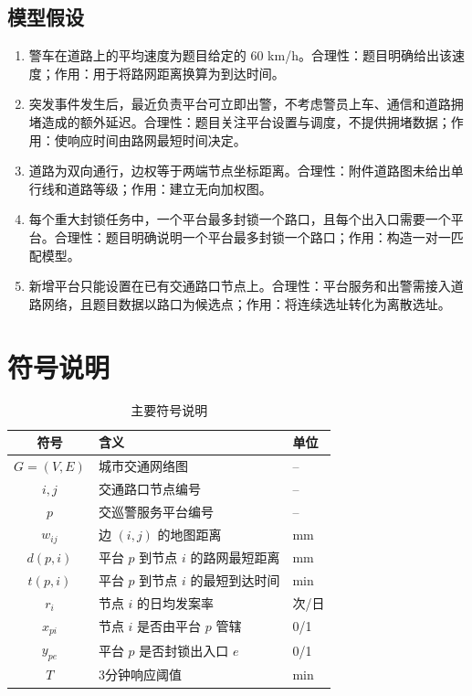 \documentclass[UTF8,a4paper,12pt]{ctexart}
\begin{document}
\subsection{模型假设}
\begin{enumerate}[label=\textbf{假设\arabic*：}]
  \item 警车在道路上的平均速度为题目给定的 60 km/h。合理性：题目明确给出该速度；作用：用于将路网距离换算为到达时间。
  \item 突发事件发生后，最近负责平台可立即出警，不考虑警员上车、通信和道路拥堵造成的额外延迟。合理性：题目关注平台设置与调度，不提供拥堵数据；作用：使响应时间由路网最短时间决定。
  \item 道路为双向通行，边权等于两端节点坐标距离。合理性：附件道路图未给出单行线和道路等级；作用：建立无向加权图。
  \item 每个重大封锁任务中，一个平台最多封锁一个路口，且每个出入口需要一个平台。合理性：题目明确说明一个平台最多封锁一个路口；作用：构造一对一匹配模型。
  \item 新增平台只能设置在已有交通路口节点上。合理性：平台服务和出警需接入道路网络，且题目数据以路口为候选点；作用：将连续选址转化为离散选址。
\end{enumerate}

\section{符号说明}
\begin{table}[H]\centering
\caption{主要符号说明}
\begin{tabular}{cll}
\toprule
符号 & 含义 & 单位 \\
\midrule
$G=(V,E)$ & 城市交通网络图 & -- \\
$i,j$ & 交通路口节点编号 & -- \\
$p$ & 交巡警服务平台编号 & -- \\
$w_{ij}$ & 边 $(i,j)$ 的地图距离 & mm \\
$d(p,i)$ & 平台 $p$ 到节点 $i$ 的路网最短距离 & mm \\
$t(p,i)$ & 平台 $p$ 到节点 $i$ 的最短到达时间 & min \\
$r_i$ & 节点 $i$ 的日均发案率 & 次/日 \\
$x_{pi}$ & 节点 $i$ 是否由平台 $p$ 管辖 & 0/1 \\
$y_{pe}$ & 平台 $p$ 是否封锁出入口 $e$ & 0/1 \\
$T$ & 3分钟响应阈值 & min \\
\bottomrule
\end{tabular}
\end{table}
\end{document}
